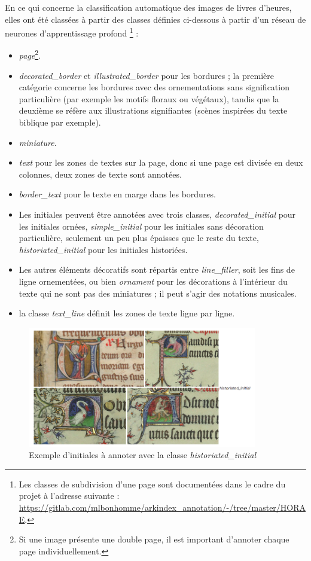 \documentclass[a4paper,12pt,twoside]{book}
\begin{document}
    En ce qui concerne la classification automatique des images de livres d'heures, elles ont été classées à partir des classes définies ci-dessous à partir d'un réseau de neurones d'apprentissage profond \footnote{Les classes de subdivision d'une page sont documentées dans le cadre du projet à l'adresse suivante : \url{https://gitlab.com/mlbonhomme/arkindex_annotation/-/tree/master/HORAE}.} :
	\begin{itemize}
	    \item \textit{page}\footnote{Si une image présente une double page, il est important d'annoter chaque page individuellement.}.
	    \item \textit{decorated\_border} et \textit{illustrated\_border} pour les bordures ; la première catégorie concerne les bordures avec des ornementations sans signification particulière (par exemple les motifs floraux ou végétaux), tandis que la deuxième se réfère aux illustrations signifiantes (scènes inspirées du texte biblique par exemple).
	    \item \textit{miniature}.
	    \item \textit{text} pour les zones de textes sur la page, donc si une page est divisée en deux colonnes, deux zones de texte sont annotées.
	    \item \textit{border\_text} pour le texte en marge dans les bordures.
	    \item Les initiales peuvent être annotées avec trois classes, \textit{decorated\_initial} pour les initiales ornées, \textit{simple\_initial} pour les initiales sans décoration particulière, seulement un peu plus épaisses que le reste du texte, \textit{historiated\_initial} pour les initiales historiées. 
	    \item Les autres éléments décoratifs sont répartis entre \textit{line\_filler}, soit les fins de ligne ornementées, ou bien \textit{ornament} pour les décorations à l'intérieur du texte qui ne sont pas des miniatures ; il peut s'agir des notations musicales.
	    \item la classe \textit{text\_line} définit les zones de texte ligne par ligne.
	\end{itemize}
	
	\begin{figure}[!h]
    \centering
    \includegraphics[width=10cm]{img/ML/historiated_initial.png}
    \caption{Exemple d'initiales à annoter avec la classe \textit{historiated\_initial}}
    \end{figure}
    
\end{document}

